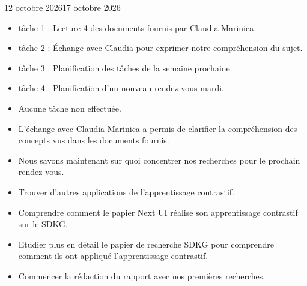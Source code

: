 \documentclass[12pt]{fiche-rd-info}
\begin{document}

\begin{fichesuivi}{12 octobre 2026}{17 octobre 2026}

	\begin{travaileffectue}
		\begin{itemize}
			\item tâche 1 : Lecture 4 des documents fournis par Claudia Marinica.
			\item tâche 2 : Échange avec Claudia pour exprimer notre compréhension du sujet.
			\item tâche 3 : Planification des tâches de la semaine prochaine.
			\item tâche 4 : Planification d'un nouveau rendez-vous mardi.
		\end{itemize}
	\end{travaileffectue}

	\begin{travailnoneffectue}
		\begin{itemize}
			\item Aucune tâche non effectuée.
		\end{itemize}
	\end{travailnoneffectue}

	\begin{echange}
		\begin{itemize}
			\item L'échange avec Claudia Marinica a permis de clarifier la compréhension des concepts vus dans les documents fournis.
			\item Nous savons maintenant sur quoi concentrer nos recherches pour le prochain rendez-vous.
		\end{itemize}
	\end{echange}

	\begin{planification}
		\begin{itemize}
			\item Trouver d'autres applications de l'apprentissage contrastif.
			\item Comprendre comment le papier Next UI réalise son apprentissage contrastif sur le SDKG.
			\item Etudier plus en détail le papier de recherche SDKG pour comprendre comment ils ont appliqué l'apprentissage contrastif.
			\item Commencer la rédaction du rapport avec nos premières recherches.
		\end{itemize}
	\end{planification}
\end{fichesuivi}
\end{document}
